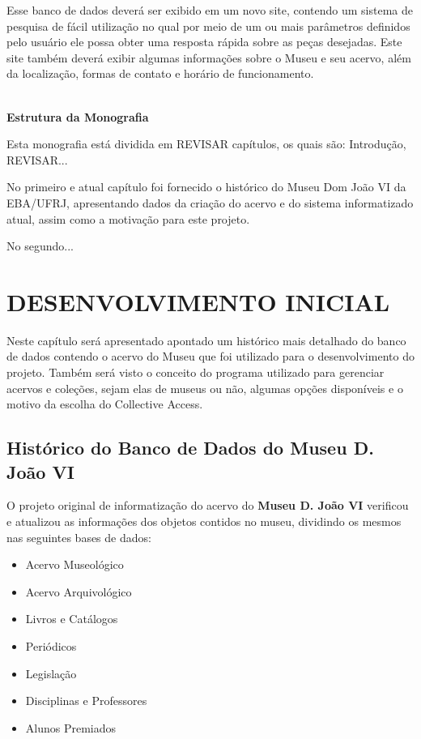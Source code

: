 \documentclass[a4paper,12pt,oneside,onecolumn,final,fleqn]{repUERJ}
\begin{document}
Esse banco de dados deverá ser exibido em um novo site, contendo um sistema de pesquisa de fácil utilização no qual por meio de um ou mais parâmetros definidos pelo usuário ele possa obter uma resposta rápida sobre as peças desejadas. Este site também deverá exibir algumas informações sobre o Museu e seu acervo, além da localização, formas de contato e horário de funcionamento.

\vspace{10pt}
$\!$\\
\textbf{Estrutura da Monografia}
\vspace{10pt}

Esta monografia está dividida em REVISAR capítulos, os quais são: Introdução, REVISAR...

No primeiro e atual capítulo foi fornecido o histórico do Museu Dom João VI da EBA/UFRJ, apresentando dados da criação do acervo e do sistema informatizado atual, assim como a motivação para este projeto.

No segundo...


\chapter{DESENVOLVIMENTO INICIAL}

Neste capítulo será apresentado apontado um histórico mais detalhado do banco de dados contendo o acervo do Museu que foi utilizado para o desenvolvimento do projeto. Também será visto o conceito do programa utilizado para gerenciar acervos e coleções, sejam elas de museus ou não, algumas opções disponíveis e o motivo da escolha do Collective Access.

\section{Histórico do Banco de Dados do Museu D. João VI}

O projeto original de informatização do acervo do \textbf{Museu D. João VI} verificou e atualizou as informações dos objetos contidos no museu, dividindo os mesmos nas seguintes bases de dados: 

\begin{itemize}
	\item Acervo Museológico
	\item Acervo Arquivológico
	\item Livros e Catálogos
	\item Periódicos
	\item Legislação
	\item Disciplinas e Professores
	\item Alunos Premiados
\end{itemize}
\end{document}
